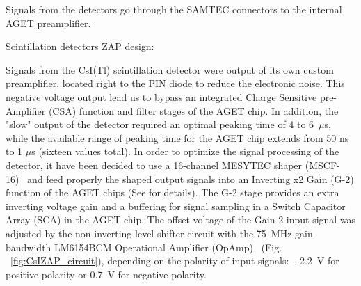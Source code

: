 \documentclass[final,number,sort&compress,5p,times,twocolumn]{elsarticle}
\begin{document}
Signals from the detectors go through the SAMTEC connectors to the internal AGET preamplifier. 

Scintillation detectors ZAP design:

Signals from the CsI(Tl) scintillation detector were output of its own custom preamplifier, located right to the PIN diode to reduce the electronic noise. This negative voltage output lead us to bypass an integrated Charge Sensitive pre-Amplifier (CSA) function and filter stages of the AGET chip. In addition, the "slow" output of the detector required an optimal peaking time of 4 to 6~$\mu$s, while the available range of peaking time for the AGET chip extends  from 50 ns to 1 $\mu$s (sixteen values total). In order to optimize the signal processing of the detector, it have been decided to use a 16-channel  MESYTEC  shaper (MSCF-16)~\cite{MESYTEC} and feed properly the shaped output signals into an Inverting x2 Gain (G-2) function of the AGET chips (See \cite{GET} for details). The G-2 stage provides an extra inverting voltage gain and a buffering for signal sampling in a Switch Capacitor Array (SCA) in the AGET chip. The offset voltage of the Gain-2 input signal was adjusted by the non-inverting level shifter circuit with the 75~MHz gain bandwidth LM6154BCM Operational Amplifier (OpAmp)~\cite{OpAmp} (Fig. ~\ref{fig:CsIZAP_circuit}), depending on the polarity of input signals: +2.2~V for positive polarity or 0.7~V for negative polarity.
\end{document}
